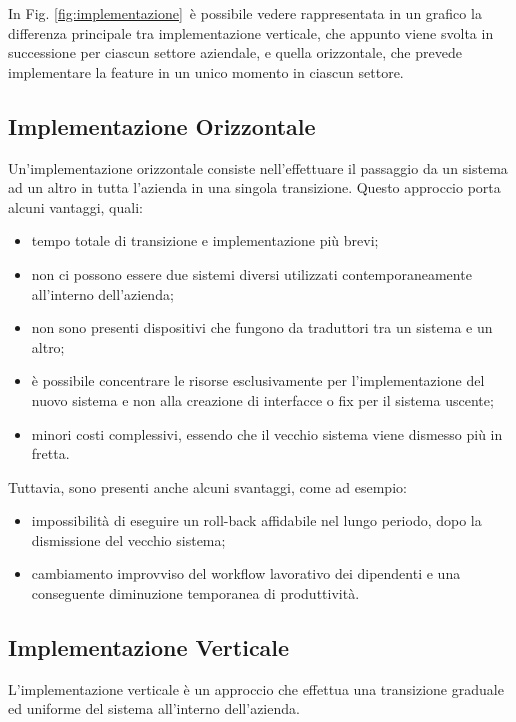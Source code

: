 	In Fig. \ref{fig:implementazione}~è possibile vedere rappresentata in un grafico la differenza principale tra implementazione verticale, che appunto viene svolta in successione per ciascun settore aziendale, e quella orizzontale, che prevede implementare la feature in un unico momento in ciascun settore.

\newpage
\subsection{Implementazione Orizzontale}

	Un'implementazione orizzontale consiste nell'effettuare il passaggio da un sistema ad un altro in tutta l'azienda in una singola transizione.
	Questo approccio porta alcuni vantaggi, quali:
	\begin{itemize}[noitemsep]
		\renewcommand\labelitemi{--}
		\item tempo totale di transizione e implementazione più brevi;
		\item non ci possono essere due sistemi diversi utilizzati contemporaneamente all’interno dell’azienda;
		\item non sono presenti dispositivi che fungono da traduttori tra un sistema e un altro;
		\item è possibile concentrare le risorse esclusivamente per l'implementazione del nuovo sistema e non alla creazione di interfacce o fix per il sistema uscente;
		\item minori costi complessivi, essendo che il vecchio sistema viene dismesso più in fretta.
	\end{itemize}
	
	Tuttavia, sono presenti anche alcuni svantaggi, come ad esempio:
	\begin{itemize}[noitemsep]
		\renewcommand\labelitemi{--}
		\item impossibilità di eseguire un roll-back affidabile nel lungo periodo, dopo la dismissione del vecchio sistema;
		\item cambiamento improvviso del workflow lavorativo dei dipendenti e una conseguente diminuzione temporanea di produttività.
	\end{itemize}

\subsection{Implementazione Verticale}

	L'implementazione verticale è un approccio che effettua una transizione graduale ed uniforme del sistema all'interno dell'azienda.
	
